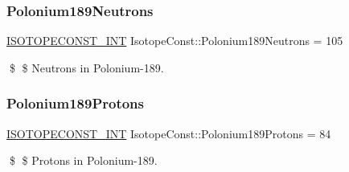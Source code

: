 \subsubsection{\texorpdfstring{Polonium189\+Neutrons}{Polonium189Neutrons}}
{\footnotesize\ttfamily \mbox{\hyperlink{group___isotope_const-_macros_ga5f18360b3e99483a35c32d789e62621c}{I\+S\+O\+T\+O\+P\+E\+C\+O\+N\+S\+T\+\_\+\+I\+NT}} Isotope\+Const\+::\+Polonium189\+Neutrons = 105}

\$ \$ Neutrons in Polonium-\/189. \mbox{\label{group___isotope_const-_polonium-_po189_ga5c2a79e0a8014e629dc43f3a1fdeb9a9}} 
\subsubsection{\texorpdfstring{Polonium189\+Protons}{Polonium189Protons}}
{\footnotesize\ttfamily \mbox{\hyperlink{group___isotope_const-_macros_ga5f18360b3e99483a35c32d789e62621c}{I\+S\+O\+T\+O\+P\+E\+C\+O\+N\+S\+T\+\_\+\+I\+NT}} Isotope\+Const\+::\+Polonium189\+Protons = 84}

\$ \$ Protons in Polonium-\/189. 